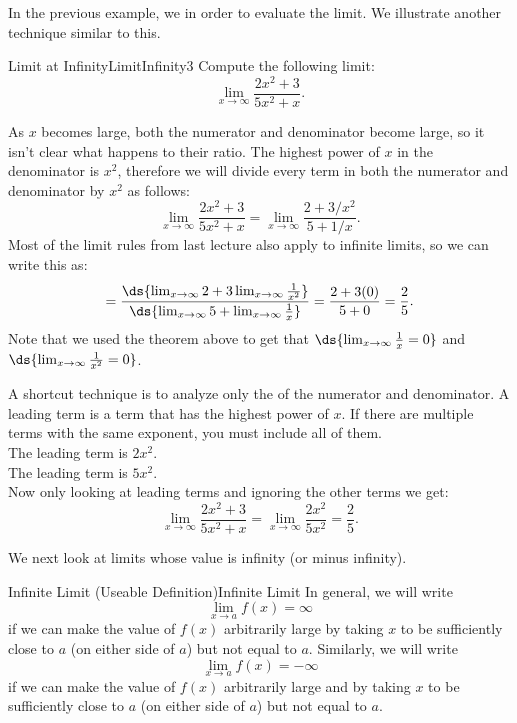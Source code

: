 In the previous example, we  in order to evaluate the limit.
We illustrate another technique similar to this.

\begin{example}{Limit at Infinity}{LimitInfinity3}
Compute the following limit:
$$\lim_{x\to\infty}\frac{2x^2+3}{5x^2+x}.$$
\vspace{-0.5cm}
\end{example}

\begin{solution} 
As $x$ becomes large, both the numerator and denominator become large, so it isn't clear what happens to their ratio. The highest power of $x$ in the denominator is $x^2$, therefore we will divide every term in both the numerator and denominator by $x^2$ as follows:
$$\lim_{x\to\infty}\frac{2x^2+3}{5x^2+x}=\lim_{x\to\infty}\frac{2+3/x^2}{5+1/x}.$$
Most of the limit rules from last lecture also apply to infinite limits, so we can write this as:
$$=\frac{\ds{\lim_{x\to\infty}2+3\lim_{x\to\infty}\frac{1}{x^2}}}{\ds{\lim_{x\to\infty}5+\lim_{x\to\infty}\frac{1}{x}}}=\frac{2+3(0)}{5+0}=\frac{2}{5}.$$
Note that we used the theorem above to get that $\ds{\lim_{x\to\infty}\frac{1}{x}=0}$ and $\ds{\lim_{x\to\infty}\frac{1}{x^2}=0}$.

A shortcut technique is to analyze only the  of the numerator and denominator. A leading term is a term that has the highest power of $x$. If there are multiple terms with the same exponent, you must include all of them.\\
 The leading term is $2x^2$.\\
 The leading term is $5x^2$.\\
Now only looking at leading terms and ignoring the other terms we get:
$$\lim_{x\to\infty}\frac{2x^2+3}{5x^2+x}=\lim_{x\to\infty}\frac{2x^2}{5x^2}=\frac{2}{5}.$$
\end{solution}

We next look at limits whose value is infinity (or minus infinity).

\begin{definition}{Infinite Limit (Useable Definition)}{Infinite Limit}
In general, we will write
$$\lim_{x\to a}f(x)=\infty$$
if we can make the value of $f(x)$ arbitrarily large by taking $x$ to be sufficiently close to $a$ (on either side of $a$) but not equal to $a$.
Similarly, we will write
$$\lim_{x\to a}f(x)=-\infty$$
if we can make the value of $f(x)$ arbitrarily large and  by taking $x$ to be sufficiently close to $a$ (on either side of $a$) but not equal to $a$.
\end{definition}

